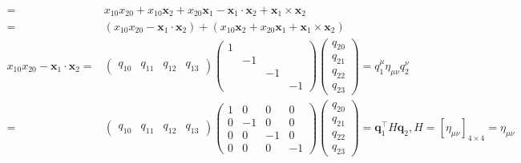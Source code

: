 \documentclass[
]{book}
\theoremstyle{definition}
\theoremstyle{definition}
\theoremstyle{definition}
\theoremstyle{definition}
\theoremstyle{remark}
\begin{document}
\[\begin{aligned}
= & x_{{\scriptscriptstyle 10}}x_{{\scriptscriptstyle 20}}+x_{{\scriptscriptstyle 10}}\boldsymbol{x}_{{\scriptscriptstyle 2}}+x_{{\scriptscriptstyle 20}}\boldsymbol{x}_{{\scriptscriptstyle 1}}-\boldsymbol{x}_{{\scriptscriptstyle 1}}\cdot\boldsymbol{x}_{{\scriptscriptstyle 2}}+\boldsymbol{x}_{{\scriptscriptstyle 1}}\times\boldsymbol{x}_{{\scriptscriptstyle 2}}\\
= & \left(x_{{\scriptscriptstyle 10}}x_{{\scriptscriptstyle 20}}-\boldsymbol{x}_{{\scriptscriptstyle 1}}\cdot\boldsymbol{x}_{{\scriptscriptstyle 2}}\right)+\left(x_{{\scriptscriptstyle 10}}\boldsymbol{x}_{{\scriptscriptstyle 2}}+x_{{\scriptscriptstyle 20}}\boldsymbol{x}_{{\scriptscriptstyle 1}}+\boldsymbol{x}_{{\scriptscriptstyle 1}}\times\boldsymbol{x}_{{\scriptscriptstyle 2}}\right)\\
x_{{\scriptscriptstyle 10}}x_{{\scriptscriptstyle 20}}-\boldsymbol{x}_{{\scriptscriptstyle 1}}\cdot\boldsymbol{x}_{{\scriptscriptstyle 2}}= & \begin{pmatrix}q_{{\scriptscriptstyle 10}} & q_{{\scriptscriptstyle 11}} & q_{{\scriptscriptstyle 12}} & q_{{\scriptscriptstyle 13}}\end{pmatrix}\begin{pmatrix}1\\
 & -1\\
 &  & -1\\
 &  &  & -1
\end{pmatrix}\begin{pmatrix}q_{{\scriptscriptstyle 20}}\\
q_{{\scriptscriptstyle 21}}\\
q_{{\scriptscriptstyle 22}}\\
q_{{\scriptscriptstyle 23}}
\end{pmatrix}=q_{{\scriptscriptstyle 1}}^{{\scriptscriptstyle \mu}}\eta_{{\scriptscriptstyle \mu\nu}}q_{{\scriptscriptstyle 2}}^{{\scriptscriptstyle \nu}}\\
= & \begin{pmatrix}q_{{\scriptscriptstyle 10}} & q_{{\scriptscriptstyle 11}} & q_{{\scriptscriptstyle 12}} & q_{{\scriptscriptstyle 13}}\end{pmatrix}\begin{pmatrix}1 & 0 & 0 & 0\\
0 & -1 & 0 & 0\\
0 & 0 & -1 & 0\\
0 & 0 & 0 & -1
\end{pmatrix}\begin{pmatrix}q_{{\scriptscriptstyle 20}}\\
q_{{\scriptscriptstyle 21}}\\
q_{{\scriptscriptstyle 22}}\\
q_{{\scriptscriptstyle 23}}
\end{pmatrix}=\boldsymbol{q}_{{\scriptscriptstyle 1}}^{\intercal}H\boldsymbol{q}_{{\scriptscriptstyle 2}},H=\left[\eta_{{\scriptscriptstyle \mu\nu}}\right]_{4\times4}=\eta_{{\scriptscriptstyle \mu\nu}}
\end{aligned}
\]
\end{document}
